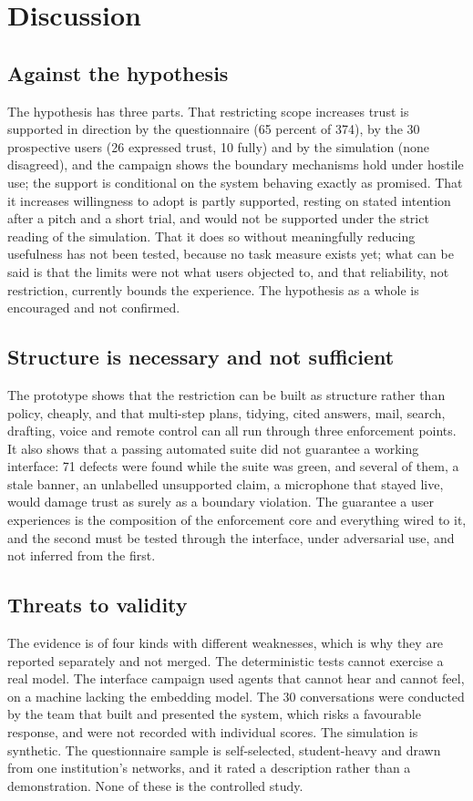 \section{Discussion}
\label{sec:discussion}

\subsection{Against the hypothesis}
The hypothesis has three parts. That restricting scope increases trust is supported in direction by the questionnaire (65 percent of 374), by the 30 prospective users (26 expressed trust, 10 fully) and by the simulation (none disagreed), and the campaign shows the boundary mechanisms hold under hostile use; the support is conditional on the system behaving exactly as promised. That it increases willingness to adopt is partly supported, resting on stated intention after a pitch and a short trial, and would not be supported under the strict reading of the simulation. That it does so without meaningfully reducing usefulness has not been tested, because no task measure exists yet; what can be said is that the limits were not what users objected to, and that reliability, not restriction, currently bounds the experience. The hypothesis as a whole is encouraged and not confirmed.

\subsection{Structure is necessary and not sufficient}
The prototype shows that the restriction can be built as structure rather than policy, cheaply, and that multi-step plans, tidying, cited answers, mail, search, drafting, voice and remote control can all run through three enforcement points. It also shows that a passing automated suite did not guarantee a working interface: 71 defects were found while the suite was green, and several of them, a stale banner, an unlabelled unsupported claim, a microphone that stayed live, would damage trust as surely as a boundary violation. The guarantee a user experiences is the composition of the enforcement core and everything wired to it, and the second must be tested through the interface, under adversarial use, and not inferred from the first.

\subsection{Threats to validity}
The evidence is of four kinds with different weaknesses, which is why they are reported separately and not merged. The deterministic tests cannot exercise a real model. The interface campaign used agents that cannot hear and cannot feel, on a machine lacking the embedding model. The 30 conversations were conducted by the team that built and presented the system, which risks a favourable response, and were not recorded with individual scores. The simulation is synthetic. The questionnaire sample is self-selected, student-heavy and drawn from one institution's networks, and it rated a description rather than a demonstration. None of these is the controlled study.

